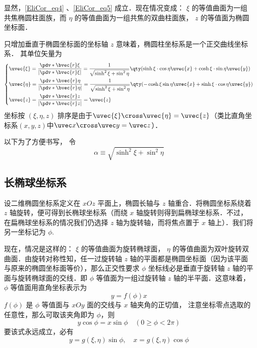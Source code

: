 显然，\autoref{EliCor_eq4} 、\autoref{EliCor_eq5} 成立．现在情况变成： $\xi$ 的等值曲面为一组共焦椭圆柱面族，而 $\eta$ 的等值曲面为一组共焦的双曲柱面族， $z$ 的等值面为椭圆坐标面．

只增加垂直于椭圆坐标面的坐标轴 $z$ 意味着，椭圆柱坐标系是一个正交曲线坐标系． 其单位矢量为
\begin{equation}
\left\{
    \begin{aligned}
    &\uvec{\xi}=\frac{\pdv*{\bvec{r}}{\xi}}{|\pdv*{\bvec{r}}{\xi}|}=\frac{1}{\sqrt{\sinh^2\xi+\sin^2\eta}}\qty(\sinh\xi\cdot\cos\eta\uvec{x}+\cosh\xi\cdot\sin\eta\uvec{y})\\
    &\uvec{\eta }=\frac{\pdv*{\bvec{r}}{\eta}}{|\pdv*{\bvec{r}}{\eta}|}=\frac{1}{\sqrt{\sinh^2\xi+\sin^2\eta}}\qty(-\cosh\xi\sin\eta\uvec{x}+\sinh\xi\cdot\cos\eta\uvec{y})\\
    &\uvec{z}=\frac{\pdv*{\bvec{r}}{z}}{|\pdv*{\bvec{r}}{z}|}=\uvec{z}
    \end{aligned}\right.
\end{equation}
坐标按 $(\xi,\eta,z)$ 排序是由于$\uvec{\xi}\cross\uvec{\eta}=\uvec{z}$（类比直角坐标系$(x,y,z)$中$\uvec x\cross\uvec y=\uvec z$）．

以下为了方便书写， 令
\begin{equation}
\alpha \equiv \sqrt{\sinh^2\xi+\sin^2\eta}
\end{equation}

\subsection{长椭球坐标系}
设二维椭圆坐标系定义在 $xOz$ 平面上，椭圆长轴与 $z$ 轴重合．将椭圆坐标系绕着 $z$ 轴旋转，便可得到长椭球坐标系（而绕 $x$ 轴旋转则得到扁椭球坐标系．不过，在扁椭球坐标系的情况我们仍选择 $z$ 轴为旋转轴，而将焦点置于 $x$ 轴上）．我们将另一坐标记为 $\phi$.

现在，情况是这样的： $\xi$ 的等值曲面为旋转椭球面， $\eta$ 的等值曲面为双叶旋转双曲面．由旋转对称性知，任一过旋转轴 $z$ 轴的平面都是椭圆坐标面（因为该平面与原来的椭圆坐标面等价），那么正交性要求 $\phi$ 坐标线必是垂直于旋转轴 $z$ 轴的平面与旋转椭球面的交线．即 $\phi$ 等值面为一组过旋转轴 $z$ 轴的半平面．这意味着， $\phi$ 等值面用直角坐标表示为
\begin{equation}
y=f(\phi)x
\end{equation}
$f(\phi)$ 是 $\phi$ 等值面与 $xOy$ 面的交线与 $x$ 轴夹角的正切值， 注意坐标零点选取的任意性，那么可取该夹角即为 $\phi$，则
\begin{equation}
y\cos\phi = x\sin\phi\quad(0\geq\phi<2\pi)
\end{equation}
要该式永远成立，必有
\begin{equation}\label{EliCor_eq2}
y = g(\xi,\eta)\sin\phi,\quad
x = g(\xi,\eta)\cos\phi
\end{equation}

